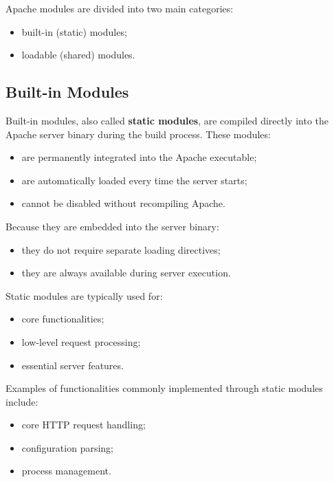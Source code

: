 \documentclass{scrbook}
\begin{document}
	Apache modules are divided into two main categories:
	\begin{itemize}
		\item built-in (static) modules;
		
		\item loadable (shared) modules.
	\end{itemize}
	
	\subsection{Built-in Modules}
	
	Built-in modules, also called \textbf{static modules}, are compiled directly into the Apache server binary during the build process. These modules:
	\begin{itemize}
		\item are permanently integrated into the Apache executable;
		
		\item are automatically loaded every time the server starts;
		
		\item cannot be disabled without recompiling Apache.
	\end{itemize}
	
	Because they are embedded into the server binary:
	\begin{itemize}
		\item they do not require separate loading directives;
		
		\item they are always available during server execution.
	\end{itemize}
	
	Static modules are typically used for:
	\begin{itemize}
		\item core functionalities;
		
		\item low-level request processing;
		
		\item essential server features.
	\end{itemize}
	
	Examples of functionalities commonly implemented through static modules include:
	\begin{itemize}
		\item core HTTP request handling;
		
		\item configuration parsing;
		
		\item process management.
	\end{itemize}
	
\end{document}
